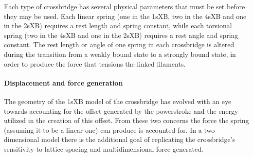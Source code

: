 \documentclass[]{article}
\begin{document}
Each type of crossbridge has several physical parameters that must be set before they may be used.
Each linear spring (one in the 1sXB, two in the 4sXB and one in the 2sXB) requires a rest length and spring constant, while each torsional spring (two in the 4sXB and one in the 2sXB) requires a rest angle and spring constant.
The rest length or angle of one spring in each crossbridge is altered during the transition from a weakly bound state to a strongly bound state, in order to produce the force that tensions the linked filaments.



\paragraph{Displacement and force generation} %
The geometry of the 1sXB model of the crossbridge has evolved with an eye towards accounting for the offset generated by the powerstroke and the energy utilized in the creation of this offset. 
From these two concerns the force the spring (assuming it to be a linear one) can produce is accounted for. 
In a two dimensional model there is the additional goal of replicating the crossbridge's sensitivity to lattice spacing and multidimensional force generated. 
\end{document}
